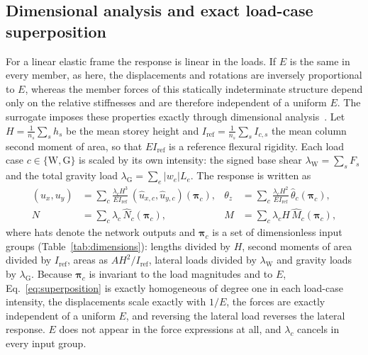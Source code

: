 \subsection{Dimensional analysis and exact load-case superposition}\label{sec:scaling}
For a linear elastic frame the response is linear in the loads. If $E$ is the same in every member, as here, the displacements and rotations are inversely proportional to $E$, whereas the member forces of this statically indeterminate structure depend only on the relative stiffnesses and are therefore independent of a uniform $E$. The surrogate imposes these properties exactly through dimensional analysis~\cite{buckingham1914pi}. Let $H=\frac{1}{n_s}\sum_s h_s$ be the mean storey height and $I_\mathrm{ref}=\frac{1}{n_s}\sum_s I_{c,s}$ the mean column second moment of area, so that $EI_\mathrm{ref}$ is a reference flexural rigidity. Each load case $c\in\{\mathrm{W},\mathrm{G}\}$ is scaled by its own intensity: the signed base shear $\lambda_\mathrm{W}=\sum_s F_s$ and the total gravity load $\lambda_\mathrm{G}=\sum_e |w_e|L_e$. The response is written as
\begin{equation}\label{eq:superposition}
\begin{aligned}
(u_x,u_y) &= \sum_{c} \frac{\lambda_c H^3}{EI_\mathrm{ref}}\,(\hat u_{x,c},\hat u_{y,c})(\boldsymbol{\pi}_c), &
\theta_z &= \sum_{c} \frac{\lambda_c H^2}{EI_\mathrm{ref}}\,\hat\theta_{c}(\boldsymbol{\pi}_c),\\
N &= \sum_c \lambda_c\, \hat N_c(\boldsymbol{\pi}_c), &
M &= \sum_c \lambda_c H\,\hat M_c(\boldsymbol{\pi}_c),
\end{aligned}
\end{equation}
where hats denote the network outputs and $\boldsymbol{\pi}_c$ is a set of dimensionless input groups (Table~\ref{tab:dimensions}): lengths divided by $H$, second moments of area divided by $I_\mathrm{ref}$, areas as $AH^2/I_\mathrm{ref}$, lateral loads divided by $\lambda_\mathrm{W}$ and gravity loads by $\lambda_\mathrm{G}$. Because $\boldsymbol{\pi}_c$ is invariant to the load magnitudes and to $E$, Eq.~\eqref{eq:superposition} is exactly homogeneous of degree one in each load-case intensity, the displacements scale exactly with $1/E$, the forces are exactly independent of a uniform $E$, and reversing the lateral load reverses the lateral response. $E$ does not appear in the force expressions at all, and $\lambda_c$ cancels in every input group.

